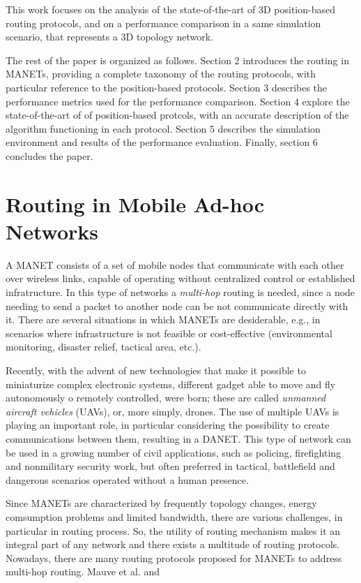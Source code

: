 \documentclass[journal,comsoc]{IEEEtran}
\begin{document}
This work focuses on the analysis of the state-of-the-art of 3D position-based routing protocols, and on a performance comparison in a same simulation scenario, that represents a 3D topology network. 
\par The rest of the paper is organized as follows. Section 2 introduces the routing in MANETs, providing a complete taxonomy of the routing protocols, with particular reference to the position-based protocols. Section 3 describes the performance metrics used for the performance comparison. Section 4 explore the state-of-the-art of of position-based protcols, with an accurate description of the algorithm functioning in each protocol. Section 5 describes the simulation environment and results of the performance evaluation. Finally, section 6 concludes the paper.

\section{Routing in Mobile Ad-hoc Networks}
A MANET consists of a set of mobile nodes that communicate with each other over wireless links, capable of operating without centralized control or established infratructure. In this type of networks a \emph{multi-hop} routing is needed, since a node needing to send a packet to another node can be not communicate directly with it. There are several situations in which MANETs are desiderable, e.g., in scenarios where infrastructure is not feasible or cost-effective (environmental monitoring, disaster relief, tactical area, etc.).
\par Recently, with the advent of new technologies that make it possible to miniaturize complex electronic systems, different gadget able to move and fly autonomously o remotely controlled, were born; these are called \emph{unmanned aircraft vehicles} (UAVs), or, more simply, drones. The use of multiple UAVs is playing an important role, in particular considering the possibility to create communications between them, resulting in a DANET. This type of network can be used in a growing number of civil applications, such as policing, firefighting and nonmilitary security work, but often preferred in tactical, battlefield and dangerous scenarios operated without a human presence.
\par Since MANETs are characterized by frequently topology changes, energy comsumption problems and limited bandwidth, there are various challenges, in particular in routing process. So, the utility of routing mechanism makes it an integral part of any network and there exists a multitude of routing protocols. Nowadays, there are many routing protocols proposed for MANETs to address multi-hop routing. Mauve et al. \cite{mauve:survey} and
\end{document}
